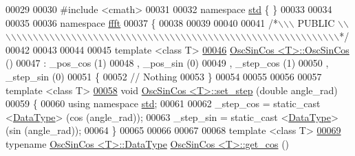 \begin{DoxyCode}
00029 
00030 \textcolor{preprocessor}{#include    <cmath>}
00031 
00032 \textcolor{keyword}{namespace }\hyperlink{a00144}{std} \{ \}
00033 
00034 
00035 
00036 \textcolor{keyword}{namespace }\hyperlink{a00142}{ffft}
00037 \{
00038 
00039 
00040 
00041 \textcolor{comment}{/*\(\backslash\)\(\backslash\)\(\backslash\) PUBLIC \(\backslash\)\(\backslash\)\(\backslash\)\(\backslash\)\(\backslash\)\(\backslash\)\(\backslash\)\(\backslash\)\(\backslash\)\(\backslash\)\(\backslash\)\(\backslash\)\(\backslash\)\(\backslash\)\(\backslash\)\(\backslash\)\(\backslash\)\(\backslash\)\(\backslash\)\(\backslash\)\(\backslash\)\(\backslash\)\(\backslash\)\(\backslash\)\(\backslash\)\(\backslash\)\(\backslash\)\(\backslash\)\(\backslash\)\(\backslash\)\(\backslash\)\(\backslash\)\(\backslash\)\(\backslash\)\(\backslash\)\(\backslash\)\(\backslash\)\(\backslash\)\(\backslash\)\(\backslash\)\(\backslash\)\(\backslash\)\(\backslash\)\(\backslash\)\(\backslash\)\(\backslash\)\(\backslash\)\(\backslash\)\(\backslash\)\(\backslash\)\(\backslash\)\(\backslash\)\(\backslash\)\(\backslash\)\(\backslash\)\(\backslash\)\(\backslash\)\(\backslash\)\(\backslash\)\(\backslash\)\(\backslash\)\(\backslash\)\(\backslash\)*/}
00042 
00043 
00044 
00045 \textcolor{keyword}{template} <\textcolor{keyword}{class} T>
\hypertarget{a00112_source_l00046}{}\hyperlink{a00020_aed332791021f51d86b05594629244f1e}{00046} \hyperlink{a00020}{OscSinCos <T>::OscSinCos} ()
00047 :   \_pos\_cos (1)
00048 ,   \_pos\_sin (0)
00049 ,   \_step\_cos (1)
00050 ,   \_step\_sin (0)
00051 \{
00052     \textcolor{comment}{// Nothing}
00053 \}
00054 
00055 
00056 
00057 \textcolor{keyword}{template} <\textcolor{keyword}{class} T>
\hypertarget{a00112_source_l00058}{}\hyperlink{a00020_ad41139a76b16a5af136d1e730a9143dc}{00058} \textcolor{keywordtype}{void}    \hyperlink{a00020}{OscSinCos <T>::set\_step} (\textcolor{keywordtype}{double} angle\_rad)
00059 \{
00060     \textcolor{keyword}{using namespace }\hyperlink{a00144}{std};
00061 
00062     \_step\_cos = static\_cast <\hyperlink{a00020_af91237051e92ce0af7aaf38b1826244d}{DataType}> (cos (angle\_rad));
00063     \_step\_sin = static\_cast <\hyperlink{a00020_af91237051e92ce0af7aaf38b1826244d}{DataType}> (sin (angle\_rad));
00064 \}
00065 
00066 
00067 
00068 \textcolor{keyword}{template} <\textcolor{keyword}{class} T>
\hypertarget{a00112_source_l00069}{}\hyperlink{a00020_aa903b64bed3d46a27aeb5af7d7154eb3}{00069} \textcolor{keyword}{typename} \hyperlink{a00020_af91237051e92ce0af7aaf38b1826244d}{OscSinCos <T>::DataType} \hyperlink{a00020}{OscSinCos <T>::get\_cos} () \textcolor{keyword}{
}
\end{DoxyCode}
